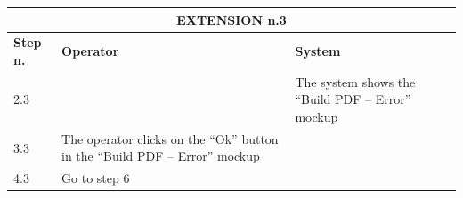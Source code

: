 {{{\begin{center}
			\begin{tabular}{|p{2cm}|p{6cm}|p{6cm}|}
			\hline
				\multicolumn{3}{|c|}{EXTENSION n.3}\\
			\hline
				\centering \vspace{1mm} \bfseries{Step n.} \vspace{1mm} & \vspace{1mm} \bfseries{Operator} \vspace{1mm} & \vspace{1mm} \bfseries{System} \vspace{1mm}\\
			\hline
				\vspace{1mm} 2.3\vspace{1mm} &
				\vspace{1mm} \vspace{1mm} & 
				\vspace{1mm} The system shows the “Build PDF – Error” mockup\vspace{1mm} \\
			\hline
				\vspace{1mm} 3.3\vspace{1mm} &
				\vspace{1mm} The operator clicks on the “Ok” button in the “Build PDF – Error” mockup\vspace{1mm} & 
				\vspace{1mm} \vspace{1mm} \\
			\hline
				\vspace{1mm} 4.3\vspace{1mm} &
				\vspace{1mm} Go to step 6\vspace{1mm} & 
				\vspace{1mm} \vspace{1mm} \\
			\hline
			\end{tabular}
			\end{center}
			
			\clearpage
	
}}}
